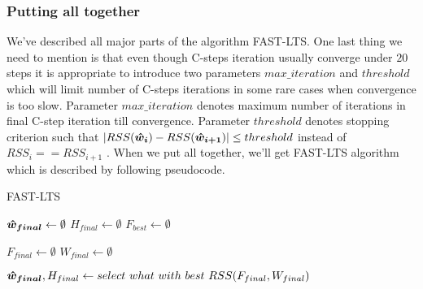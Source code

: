 \subsubsection{Putting all together}
We've described all major parts of the algorithm FAST-LTS. One last thing we need to mention is that even though C-steps iteration usually converge under $20$ steps it is appropriate to introduce two parameters $max\_iteration$ and $threshold$ which will limit number of C-steps iterations in some rare cases when convergence is too slow. Parameter $max\_iteration$ denotes maximum number of iterations in final C-step iteration till convergence. Parameter $threshold$ denotes stopping criterion such that $| RSS(\boldsymbol{\hat{w}_{i}}) - RSS(\boldsymbol{\hat{w}_{i+1}})| \leq threshold$ instead of 
$RSS_{i} == RSS_{i+1}$ . When we put all together, we'll get FAST-LTS algorithm which is described by following pseudocode.


\begin{algorithm}[H]
	\label{alg:FAST-LTS}
	\caption{FAST-LTS}
	$\boldsymbol{\hat{w}_{final}} \gets \emptyset$\;
	$H_{final} \gets \emptyset$\;
	$F_{best} \gets \emptyset$\;


	$F_{final} \gets \emptyset$\;
	$W_{final} \gets \emptyset$\;

	$\boldsymbol{\hat{w}_{final}}, H_{final} \gets select~what~with~best~RSS(F_{final}, W_{final})$\;

	\;
\end{algorithm}


